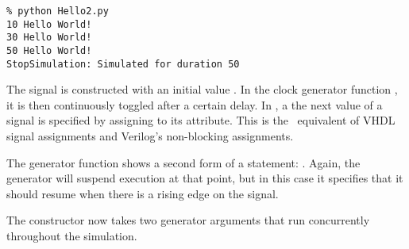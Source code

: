 \begin{verbatim}
% python Hello2.py
10 Hello World!
30 Hello World!
50 Hello World!
StopSimulation: Simulated for duration 50

\end{verbatim}

The  signal is constructed with an initial value
. In the clock generator function , it is then
continuously toggled after a certain delay. In \myhdl{}, a the next
value of a signal is specified by assigning to its 
attribute. This is the \myhdl\ equivalent of VHDL signal assignments
and Verilog's non-blocking assignments.

The  generator function shows a second form of a
 statement: . Again,
the generator will suspend execution at that point, but in this case
it specifies that it should resume when there is a rising edge on the
signal.

The  constructor now takes two generator arguments
that run concurrently throughout the simulation.






